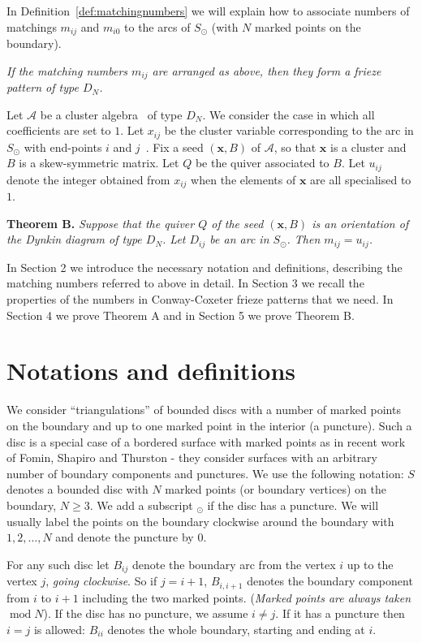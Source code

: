 \documentclass[a4paper]{amsart}
\begin{document}
In Definition~\ref{def:matchingnumbers} we will explain how to associate
numbers of matchings $m_{ij}$ and $m_{i0}$ to the arcs of $S_{\odot}$ (with
$N$ marked points on the boundary).

\emph{If the matching numbers $m_{ij}$ are arranged as above,
then they form a frieze pattern of type $D_N$.}

Let $\mathcal{A}$ be a cluster algebra~\cite{fominzelevinsky02} of type
$D_N$. We consider the case in which all coefficients
are set to $1$. Let $x_{ij}$ be the cluster variable corresponding
to the arc in $S_{\odot}$ with end-points $i$ and
$j$~\cite{fst06,schiffler06}. 
Fix a seed $(\mathbf{x},B)$ of $\mathcal{A}$, so that $\mathbf{x}$ is
a cluster and $B$ is a skew-symmetric matrix. Let $Q$ be the
quiver associated to $B$. Let $u_{ij}$ denote the integer obtained
from $x_{ij}$ when the elements of $\mathbf{x}$ are all specialised to $1$.

\noindent \textbf{Theorem B.}
\emph{Suppose that the quiver $Q$ of the seed $(\mathbf{x},B)$ is
an orientation of the Dynkin diagram of type $D_N$.
Let $D_{ij}$ be an arc in $S_{\odot}$. Then $m_{ij}=u_{ij}$.}

In Section 2 we introduce the necessary notation and definitions,
describing the matching numbers referred to above in detail. In
Section 3 we recall the properties of the numbers in Conway-Coxeter
frieze patterns that we need. In Section 4 we prove Theorem A
and in Section 5 we prove Theorem B.

\section{Notations and definitions}
\label{sec:notation}

We consider ``triangulations''
of bounded discs with a number
of marked points on the boundary and up to
one marked point in the interior (a puncture).
Such a disc is a special case of a bordered surface 
with marked points as in
recent work~\cite{fst06} of Fomin, Shapiro and Thurston
- they consider surfaces with an arbitrary number of boundary
components and punctures.
We use the following notation:
$S$ denotes a bounded disc with $N$ marked points
(or boundary vertices) on the boundary, $N\ge 3$.
We add a subscript $_{\odot}$
if the disc has a puncture.
We will usually label the points on the boundary clockwise around the
boundary with $1,2,\dots,N$ and denote the puncture by $0$.

For any such disc
let $B_{ij}$ denote the boundary arc
from the vertex $i$ up to the vertex $j$, {\em going clockwise}.
So if $j=i+1$, $B_{i,i+1}$ denotes the boundary component
from $i$ to $i+1$ including the two marked points.
({\em Marked points are always taken ${\operatorname{mod}\nolimits} N$}).
If the disc has no puncture, we assume $i\neq j$.
If it has a puncture then $i=j$ is allowed:
$B_{ii}$ denotes the whole boundary, starting and ending at $i$.
\end{document}
